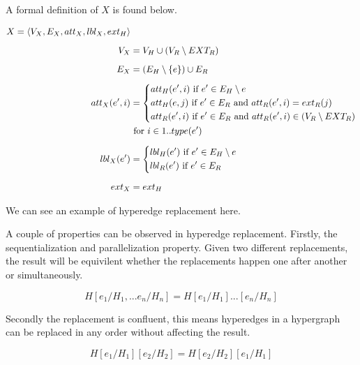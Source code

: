     A formal definition of $X$ is found below. 

    \begin{align*}
    X = \langle V_X, E_X, att_X, lbl_X, ext_H \rangle \\[2mm]
    V_X &= V_H \cup (V_R \setminus EXT_R) \\[2mm]
    E_X &= (E_H \setminus \{e\}) \cup E_R \\[2mm]
    att_X(e', i) &= \begin{dcases*}
      att_H(e', i) \textrm{ if } e' \in E_H \setminus {e} \\
      att_H(e, j) \textrm{ if } e' \in E_R \textrm{ and } att_R(e', i) = ext_R(j) \\
      att_R(e', i) \textrm{ if } e' \in E_R \textrm{ and } att_R(e', i) \in (V_R \setminus EXT_R)
    \end{dcases*} \\
    &\ \textrm{for } i \in 1..type(e') \\[2mm]
    lbl_X(e') &= \begin{dcases*}
      lbl_H(e') \textrm{ if } e' \in E_H \setminus {e} \\
      lbl_R(e') \textrm{ if } e' \in E_R
    \end{dcases*} \\[2mm]
    ext_X &= ext_H
    \end{align*}

    We can see an example of hyperedge replacement here.
    
    

    A couple of properties can be observed in hyperedge replacement. Firstly, the sequentialization and parallelization property. Given two different replacements, the result will be equivilent whether the replacements happen one after another or simultaneously.

    \begin{equation}
    H[e_1/H_1,...e_n/H_n] = H[e_1/H_1]...[e_n/H_n]
    \end{equation}

    Secondly the replacement is confluent, this means hyperedges in a hypergraph can be replaced in any order without affecting the result.

    \begin{equation}
    H[e_1/H_1][e_2/H_2] = H[e_2/H_2][e_1/H_1]
    \end{equation}

